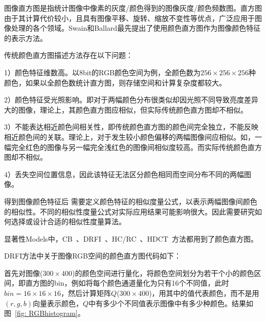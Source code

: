 \documentclass[12pt]{article}
\begin{document}
图像直方图是指统计图像中像素的灰度/颜色得到的图像灰度/颜色频数图。直方图由于其计算代价较小，且具有图像平移、旋转、缩放不变性等优点，广泛应用于图像处理的各个领域。Swain和Ballard最先提出了使用颜色直方图作为图像颜色特征的表示方法。

传统颜色直方图描述方法存在以下问题：

1）颜色特征维数高。以8bit的RGB颜色空间为例，全颜色数为$256 \times 256 \times 256$种颜色，如果以全颜色数统计直方图，则存储空间和计算复杂度都较大。

2）颜色特征受光照影响。即对于两幅颜色分布很类似却因光照不同导致亮度差异大的图像，理论上，其颜色直方图应相似，但实际传统颜色直方图却不相似。

3）不能表达相近颜色间相关性，即传统颜色直方图的颜色间完全独立，不能反映相近颜色间的关联。理论上，对于发生较小颜色偏移的两幅图像间应相似。如，一幅完全红色的图像与另一幅完全浅红色的图像间相似度较高。而实际传统颜色直方图却不相似。

4）丢失空间位置信息，因此该特征无法区分颜色相同而空间分布不同的两幅图像。

得到图像颜色特征后 需要定义颜色特征的相似度量公式，以表示两幅图像间颜色的相似性。不同的相似性度量公式对实际应用结果可能影响很大。因此需要研究如何选择或设计合适的相似性度量算法。

显著性Models中，CB~\cite{jiang2011automatic}、DRFI~\cite{jianghuaizu2013salient}、HC/RC~\cite{cheng2011global}、HDCT~\cite{kim2014salient}方法都用到了颜色直方图。

DRFI方法中关于图像RGB空间的颜色直方图代码如下：



首先对图像($300 \times 400$)的颜色空间进行量化，将颜色空间划分为若干个小的颜色区间，即直方图的bin，例如将每个颜色通道量化为只有16个不同值，此时$bin = 16 \times 16 \times 16$，然后计算矩阵$Q$($300 \times 400$)，用其中的值代表颜色，而不是用$(r, g, b)$向量表示颜色，$Q$中有多少个不同值表示图像中有多少种颜色。结果如图~\ref{fig: RGBhistogram}。
\end{document}
